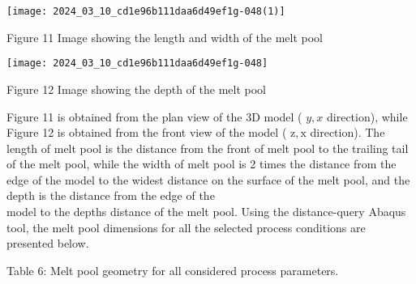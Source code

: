 \documentclass[10pt]{article}
\begin{document}
\begin{center}
\texttt{[image: 2024\_03\_10\_cd1e96b111daa6d49ef1g-048(1)]}
\end{center}

Figure 11 Image showing the length and width of the melt pool

\begin{center}
\texttt{[image: 2024\_03\_10\_cd1e96b111daa6d49ef1g-048]}
\end{center}

Figure 12 Image showing the depth of the melt pool

Figure 11 is obtained from the plan view of the 3D model ( $y, x$ direction), while Figure 12 is obtained from the front view of the model ( $\mathrm{z}, \mathrm{x}$ direction). The length of melt pool is the distance from the front of melt pool to the trailing tail of the melt pool, while the width of melt pool is 2 times the distance from the edge of the model to the widest distance on the surface of the melt pool, and the depth is the distance from the edge of the\\
model to the depths distance of the melt pool. Using the distance-query Abaqus tool, the melt pool dimensions for all the selected process conditions are presented below.

Table 6: Melt pool geometry for all considered process parameters.
\end{document}
